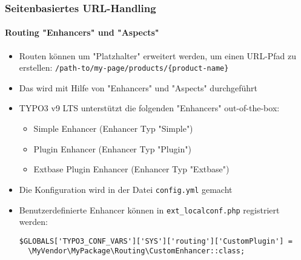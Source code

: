 \begin{frame}[fragile]
	\frametitle{Seitenbasiertes URL-Handling}
	\framesubtitle{Routing "Enhancers" und "Aspects"}

	\lstset{basicstyle=\smaller\ttfamily}

	\begin{itemize}
		\item Routen können um "Platzhalter" erweitert werden, um einen URL-Pfad zu erstellen:
			\smaller\texttt{/path-to/my-page/products/\{product-name\}}\normalsize
		\item Das wird mit Hilfe von "Enhancers" und "Aspects" durchgeführt
		\item TYPO3 v9 LTS unterstützt die folgenden "Enhancers" out-of-the-box:

			\begin{itemize}
				\item Simple Enhancer (Enhancer Typ "Simple")
				\item Plugin Enhancer (Enhancer Typ "Plugin")
				\item Extbase Plugin Enhancer (Enhancer Typ "Extbase")
			\end{itemize}

		\item Die Konfiguration wird in der Datei \texttt{config.yml} gemacht
		\item Benutzerdefinierte Enhancer können in \texttt{ext\_localconf.php} registriert werden:

\begin{lstlisting}
$GLOBALS['TYPO3_CONF_VARS']['SYS']['routing']['CustomPlugin'] =
  \MyVendor\MyPackage\Routing\CustomEnhancer::class;
\end{lstlisting}
	\end{itemize}

\end{frame}



